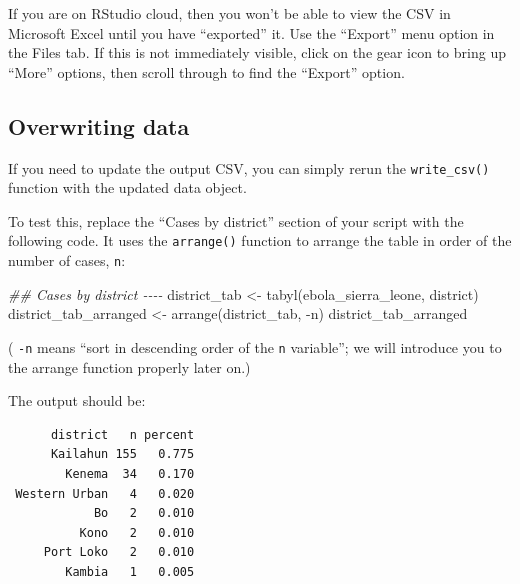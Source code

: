\documentclass[
  letterpaper,
  DIV=11,
  numbers=noendperiod]{scrreprt}
\newenvironment{Shaded}{\begin{snugshade}}{\end{snugshade}}
\newcommand{\DocumentationTok}[1]{\textcolor[rgb]{0.37,0.37,0.37}{\textit{#1}}}
\newcommand{\FunctionTok}[1]{\textcolor[rgb]{0.28,0.35,0.67}{#1}}
\newcommand{\NormalTok}[1]{\textcolor[rgb]{0.00,0.23,0.31}{#1}}
\newcommand{\OtherTok}[1]{\textcolor[rgb]{0.00,0.23,0.31}{#1}}
\newcommand{\SpecialCharTok}[1]{\textcolor[rgb]{0.37,0.37,0.37}{#1}}
\begin{document}
\begin{tcolorbox}[enhanced jigsaw, colframe=quarto-callout-note-color-frame, rightrule=.15mm, opacityback=0, breakable, coltitle=black, colbacktitle=quarto-callout-note-color!10!white, bottomrule=.15mm, leftrule=.75mm, toprule=.15mm, arc=.35mm, bottomtitle=1mm, colback=white, left=2mm, opacitybacktitle=0.6, titlerule=0mm, title=\textcolor{quarto-callout-note-color}{\faInfo}\hspace{0.5em}{RStudio Cloud}, toptitle=1mm]

If you are on RStudio cloud, then you won't be able to view the CSV in
Microsoft Excel until you have ``exported'' it. Use the ``Export'' menu
option in the Files tab. If this is not immediately visible, click on
the gear icon to bring up ``More'' options, then scroll through to find
the ``Export'' option.

\end{tcolorbox}

\hypertarget{overwriting-data}{%
\subsection{Overwriting data}\label{overwriting-data}}

If you need to update the output CSV, you can simply rerun the
\texttt{write\_csv()} function with the updated data object.

To test this, replace the ``Cases by district'' section of your script
with the following code. It uses the \texttt{arrange()} function to
arrange the table in order of the number of cases, \texttt{n}:

\begin{Shaded}
\begin{Highlighting}[]
\DocumentationTok{\#\# Cases by district {-}{-}{-}{-}}
\NormalTok{district\_tab }\OtherTok{\textless{}{-}} \FunctionTok{tabyl}\NormalTok{(ebola\_sierra\_leone, district)}
\NormalTok{district\_tab\_arranged }\OtherTok{\textless{}{-}} \FunctionTok{arrange}\NormalTok{(district\_tab, }\SpecialCharTok{{-}}\NormalTok{n)}
\NormalTok{district\_tab\_arranged}
\end{Highlighting}
\end{Shaded}

( \texttt{-n} means ``sort in descending order of the \texttt{n}
variable''; we will introduce you to the arrange function properly later
on.)

The output should be:

\begin{verbatim}
      district   n percent
      Kailahun 155   0.775
        Kenema  34   0.170
 Western Urban   4   0.020
            Bo   2   0.010
          Kono   2   0.010
     Port Loko   2   0.010
        Kambia   1   0.005
\end{verbatim}
\end{document}

